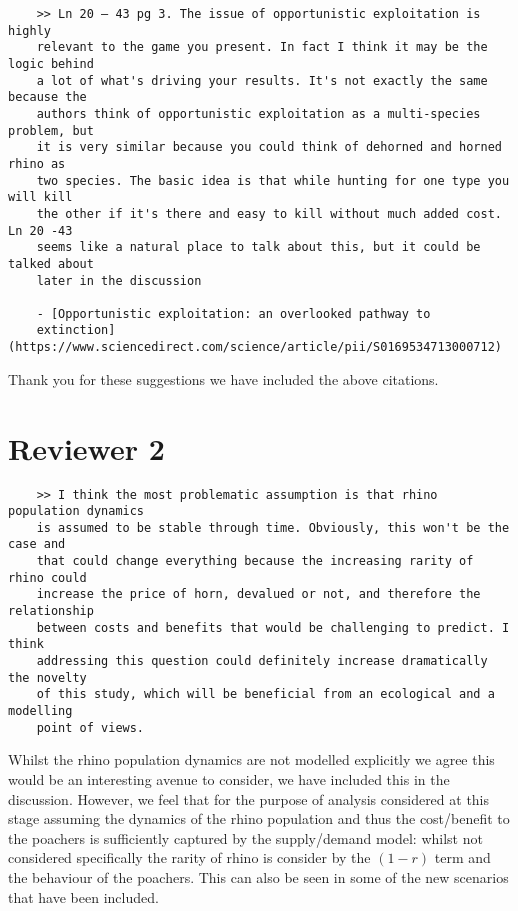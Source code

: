 \documentclass[10pt]{article}
\begin{document}
\begin{verbatim}
    >> Ln 20 – 43 pg 3. The issue of opportunistic exploitation is highly
    relevant to the game you present. In fact I think it may be the logic behind
    a lot of what's driving your results. It's not exactly the same because the
    authors think of opportunistic exploitation as a multi-species problem, but
    it is very similar because you could think of dehorned and horned rhino as
    two species. The basic idea is that while hunting for one type you will kill
    the other if it's there and easy to kill without much added cost.  Ln 20 -43
    seems like a natural place to talk about this, but it could be talked about
    later in the discussion

    - [Opportunistic exploitation: an overlooked pathway to
    extinction](https://www.sciencedirect.com/science/article/pii/S0169534713000712)
\end{verbatim}

Thank you for these suggestions we have included the above citations.

\section{Reviewer 2}

\begin{verbatim}
    >> I think the most problematic assumption is that rhino population dynamics
    is assumed to be stable through time. Obviously, this won't be the case and
    that could change everything because the increasing rarity of rhino could
    increase the price of horn, devalued or not, and therefore the relationship
    between costs and benefits that would be challenging to predict. I think
    addressing this question could definitely increase dramatically the novelty
    of this study, which will be beneficial from an ecological and a modelling
    point of views.
\end{verbatim}

Whilst the rhino population dynamics are not modelled explicitly we agree this
would be an interesting avenue to consider, we have included this in the
discussion. However, we feel that for the purpose of analysis considered at this
stage assuming the dynamics of the rhino population and thus the cost/benefit to
the poachers is sufficiently captured by the supply/demand model: whilst not
considered specifically the rarity of rhino is consider by the \((1-r)\) term
and the behaviour of the poachers. This can also be seen in some of the new
scenarios that have been included.
\end{document}
